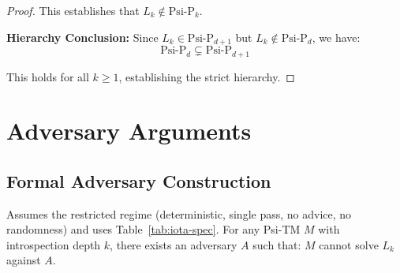 \begin{proof}
This establishes that $L_k \notin \text{Psi-P}_k$.

\textbf{Hierarchy Conclusion:}
Since $L_k \in \text{Psi-P}_{d+1}$ but $L_k \notin \text{Psi-P}_d$, we have:
$$\text{Psi-P}_d \subsetneq \text{Psi-P}_{d+1}$$

This holds for all $k \geq 1$, establishing the strict hierarchy.
\end{proof}

\section{Adversary Arguments}

\subsection{Formal Adversary Construction}

\begin{theorem}
\label{thm:adversary-lower-bound-2}
Assumes the restricted regime (deterministic, single pass, no advice, no randomness) and uses Table~\ref{tab:iota-spec}.
For any Psi-TM $M$ with introspection depth $k$, there exists an adversary $A$ such that:
$M$ cannot solve $L_k$ against $A$.
\end{theorem}

